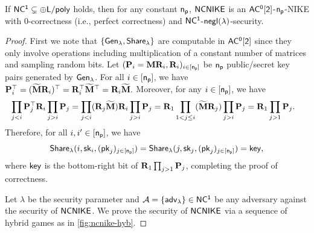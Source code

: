 \begin{theorem}
\label{thm:nc-nike}
If $\mathsf{NC^1} \subsetneq {\sf \oplus L/poly}$ holds, then for any constant $\mathsf{n_p}$, ${\mathsf{NCNIKE}}$ is an $\mathsf{AC^0[2]}$-$\mathsf{n_p}$-NIKE with $0$-correctness (i.e., perfect correctness) and $\mathsf{NC^1}$-$\mathsf{negl}(\lambda)$-security.
\end{theorem}
\begin{proof}

First we note that $\{{\mathsf{Gen}}_\lambda,{\mathsf{Share}}_\lambda\}$ are computable in $\mathsf{AC^0[2]}$ since they only involve operations including multiplication of a constant number of matrices and sampling random bits.
Let $(\mathbf{{P}}_i=\mathbf{{M}}\mathbf{{R}}_i,\mathbf{{R}}_i)_{i\in{[\mathsf{n_p}]}}$ be $\mathsf{n_p}$ public/secret key pairs generated by ${\mathsf{Gen}}_\lambda$. For all $i\in{[\mathsf{n_p}]}$, we have 
$\mathbf{{P}}_i^\top=(\widetilde{\mathbf{{M}}}{\mathbf{{R}}}_i)^\top={\mathbf{{R}}}_i^\top\widetilde{\mathbf{{M}}}^\top={\mathbf{{R}}}_i\widetilde{\mathbf{{M}}}.$
Moreover, for any $i\in{[\mathsf{n_p}]}$, we have 
\[\begin{split}
&\prod_{j<i}\mathbf{{P}}_j^\top\mathbf{{R}}_i\prod_{j>i}\mathbf{{P}}_j
=\prod_{j<i}({\mathbf{{R}}}_j\widetilde{\mathbf{{M}}})\mathbf{{R}}_i\prod_{j>i}\mathbf{{P}}_j
=\mathbf{{R}}_1\prod_{1<j\leq i}(\widetilde{\mathbf{{M}}}{\mathbf{{R}}}_j)\prod_{j>i}\mathbf{{P}}_j
=\mathbf{{R}}_1\prod_{j>1}\mathbf{{P}}_j.
\end{split}\]
Therefore, for all $i,i'\in{[\mathsf{n_p}]}$, we have 
$${\mathsf{Share}}_\lambda(i,\mathsf{sk}_i,(\mathsf{pk}_j)_{j\in[\mathsf{n_p}]})={\mathsf{Share}}_\lambda(j,\mathsf{sk}_j,(\mathsf{pk}_j)_{j\in[\mathsf{n_p}]})=\mathsf{key},$$ where $\mathsf{key}$ is the bottom-right bit of $\mathbf{{R}}_1\prod_{j>1}\mathbf{{P}}_j$, completing the proof of correctness.


Let $\lambda$ be the security parameter and $\mathcal{A}=\{{\mathsf{adv}}_\lambda\}\in\mathsf{NC^1}$ be any adversary against the security of ${\mathsf{NCNIKE}}$.
We prove the security of ${\mathsf{NCNIKE}}$ via a sequence of hybrid games as in \cref{fig:ncnike-hyb}.  %


\end{proof}
